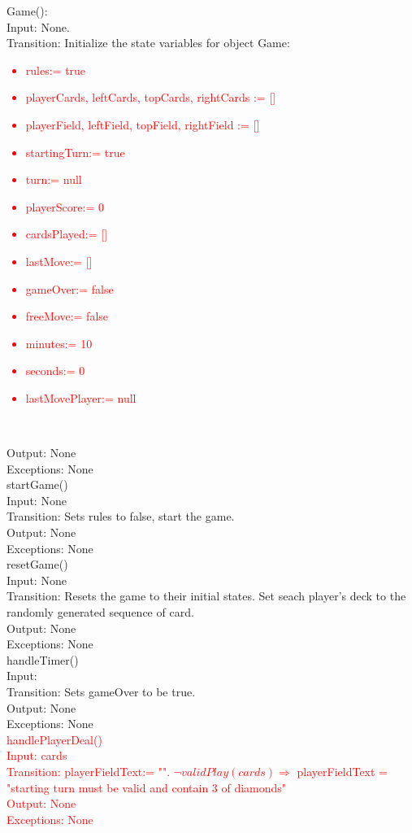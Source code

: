\documentclass[12pt, titlepage]{article}
\begin{document}
Game(): \\
Input: None.\\
Transition: Initialize the state variables for object Game: 
\textcolor{red}{
\begin{itemize}
    \item rules:= true
    \item playerCards, leftCards, topCards, rightCards := []
    \item playerField, leftField, topField, rightField := []
    \item startingTurn:= true
    \item turn:= null
    \item playerScore:= 0
    \item cardsPlayed:= []
    \item lastMove:= []
    \item gameOver:= false
    \item freeMove:= false
    \item minutes:= 10
    \item seconds:= 0
    \item lastMovePlayer:= null
\end{itemize}\\}
Output: None\\
Exceptions: None \\

\noindent startGame()\\
Input: None\\
Transition: Sets rules to false, start the game. \\
Output: None\\
Exceptions: None \\

\noindent resetGame()\\
Input: None\\
Transition: Resets the game to their initial states. Set seach player's deck to the randomly generated sequence of card. \\
Output: None\\
Exceptions: None \\

\noindent handleTimer()\\
Input: \\
Transition: Sets gameOver to be true. \\
Output: None\\
Exceptions: None \\


\noindent \textcolor{red}{handlePlayerDeal()\\
Input: cards\\
Transition: playerFieldText:= "". $\neg validPlay(cards) \Rightarrow$ playerFieldText = "starting turn must be valid and contain 3 of diamonds"\\
Output: None\\
Exceptions: None \\
}
\end{document}
